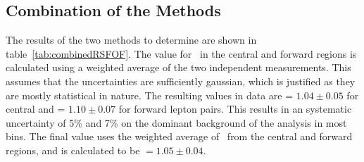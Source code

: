 \subsection{Combination of the Methods}
The results of the two methods to determine \rsfof are shown in table~\ref{tab:combinedRSFOF}.
The value for \rsfof\ in the central and forward regions is calculated using a weighted average of the two independent measurements.
This assumes that the uncertainties are sufficiently gaussian,
which is justified as they are mostly statistical in nature.
The resulting values in data are \rsfof = $1.04\pm0.05$ for central and \rsfof = $1.10\pm0.07$ for forward lepton pairs.
This results in an systematic uncertainty of 5\% and 7\% on the dominant background of the analysis in most bins.
The final value uses the weighted average of \rsfof\ from the central and forward regions,
and is calculated to be \rsfof $ = 1.05 \pm 0.04$.
